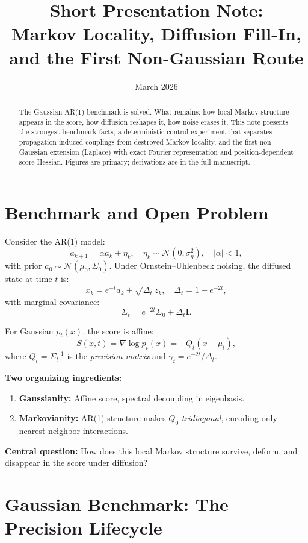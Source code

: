 \documentclass[11pt,a4paper]{article}
\title{\textbf{Short Presentation Note:\\Markov Locality, Diffusion Fill-In, and the First Non-Gaussian Route}}
\author{}
\date{March 2026}
\newcommand{\bm}[1]{\mathbf{#1}}
\begin{document}
\maketitle

\begin{abstract}
\noindent
The Gaussian AR(1) benchmark is solved. What remains: how local Markov structure appears in the score, how diffusion reshapes it, how noise erases it. This note presents the strongest benchmark facts, a deterministic control experiment that separates propagation-induced couplings from destroyed Markov locality, and the first non-Gaussian extension (Laplace) with exact Fourier representation and position-dependent score Hessian. Figures are primary; derivations are in the full manuscript.
\end{abstract}

\section{Benchmark and Open Problem}

Consider the AR(1) model:
\[
a_{k+1} = \alpha a_k + \eta_k, \quad \eta_k \sim \mathcal{N}(0, \sigma_\eta^2), \quad |\alpha| < 1,
\]
with prior $a_0 \sim \mathcal{N}(\mu_0, \Sigma_0)$. Under Ornstein--Uhlenbeck noising, the diffused state at time $t$ is:
\[
x_k = e^{-t} a_k + \sqrt{\Delta_t} \, z_k, \quad \Delta_t = 1 - e^{-2t},
\]
with marginal covariance:
\[
\Sigma_t = e^{-2t} \Sigma_0 + \Delta_t \bm{I}.
\]

For Gaussian $p_t(x)$, the score is affine:
\[
S(x,t) = \nabla \log p_t(x) = -Q_t(x - \mu_t),
\]
where $Q_t = \Sigma_t^{-1}$ is the \textit{precision matrix} and $\gamma_t = e^{-2t}/\Delta_t$.

\vspace{0.3cm}
\noindent
\textbf{Two organizing ingredients:}
\begin{enumerate}[label=(\roman*)]
  \item \textbf{Gaussianity:} Affine score, spectral decoupling in eigenbasis.
  \item \textbf{Markovianity:} AR(1) structure makes $Q_0$ \textit{tridiagonal}, encoding only nearest-neighbor interactions.
\end{enumerate}

\vspace{0.3cm}
\noindent
\textbf{Central question:} How does this local Markov structure survive, deform, and disappear in the score under diffusion?

\section{Gaussian Benchmark: The Precision Lifecycle}
\end{document}
